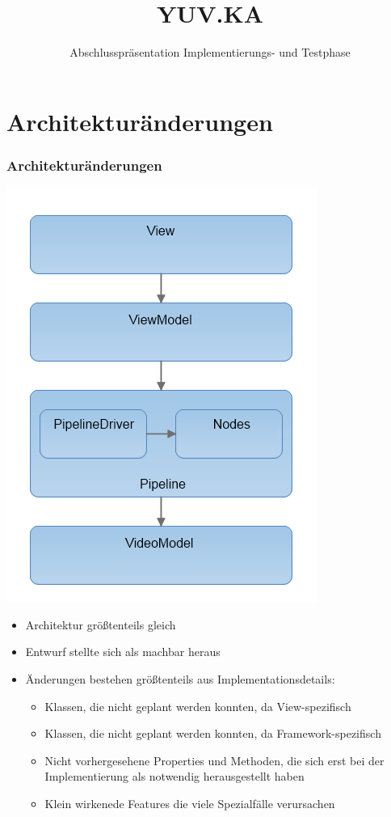 \documentclass[t]{beamer}
\title{YUV.KA}
\subtitle{Abschlusspräsentation Implementierungs- und Testphase}
\institute[ITEC]{Institut für Technische Informatik}
\begin{document}
\begin{frame}
\maketitle
\end{frame}
 
\section{Architekturänderungen}
\begin{frame}
    \frametitle{Architekturänderungen}
    \noindent
    \begin{minipage}{3.5cm}
        \includegraphics[scale=0.37]{images/Layers.png}
    \end{minipage}
    \hfill
    \begin{minipage}{8cm}
    \begin{itemize}
        \item Architektur größtenteils gleich
        \item Entwurf stellte sich als machbar heraus
        \item Änderungen bestehen größtenteils aus Implementationsdetails:
        \begin{itemize}
            \item Klassen, die nicht geplant werden konnten, da View-spezifisch
            \item Klassen, die nicht geplant werden konnten, da Framework-spezifisch
            \item Nicht vorhergesehene Properties und Methoden, die sich erst bei der Implementierung als notwendig herausgestellt haben
            \item Klein wirkenede Features die viele Spezialfälle verursachen
        \end{itemize}
    \end{itemize}
    \end{minipage}
\end{frame}
\end{document}
